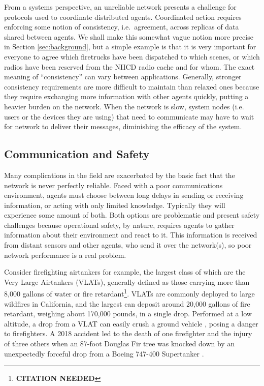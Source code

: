 \documentclass[]             %
{NASA}                       %
\theoremstyle{definition}
\newcommand{\citationneeded}{\footnote{\textbf{CITATION NEEDED}}}
\begin{document}
From a systems perspective, an unreliable network presents a challenge
for protocols used to coordinate distributed agents. Coordinated
action requires enforcing some notion of consistency, i.e.~agreement,
across replicas of data shared between agents. We shall make this
somewhat vague notion more precise in Section \ref{sec:background},
but a simple example is that it is very important for everyone to
agree which firetrucks have been dispatched to which scenes, or which
radios have been reserved from the {\mbox{NIICD}} radio cache
\cite{radiocache} and for whom. The exact meaning of ``consistency''
can vary between applications. Generally, stronger consistency
requirements are more difficult to maintain than relaxed ones because
they require exchanging more information with other agents quickly,
putting a heavier burden on the network. When the network is slow,
system nodes (i.e. users or the devices they are using) that need to
communicate may have to wait for network to deliver their messages,
diminishing the efficacy of the system.

\subsection{Communication and Safety}
\label{communication-and-safety}

Many complications in the field are exacerbated by the basic fact that
the network is never perfectly reliable. Faced with a poor
communications environment, agents must choose between long delays in
sending or receiving information, or acting with only limited
knowledge. Typically they will experience some amount of both. Both
options are problematic and present safety challenges because
operational safety, by nature, requires agents to gather information
about their environment and react to it. This information is received
from distant sensors and other agents, who send it over the
network(s), so poor network performance is a real problem.

Consider firefighting airtankers for example, the largest class of
which are the Very Large Airtankers (VLATs), generally defined as
those carrying more than 8,000 gallons of water or fire
retardant\citationneeded. VLATs are commonly deployed to large
wildfires in California, and the largest can deposit around 20,000
gallons of fire retardant, weighing about 170,000 pounds, in a single
drop. Performed at a low altitude, a drop from a VLAT can easily crush
a ground vehicle \cite{2019:stickney}, posing a danger to
firefighters. A 2018 accident led to the death of one firefighter and
the injury of three others when an 87-foot Douglas Fir tree was
knocked down by an unexpectedly forceful drop from a Boeing 747-400
Supertanker \cite{2018:calfire}.
\end{document}
